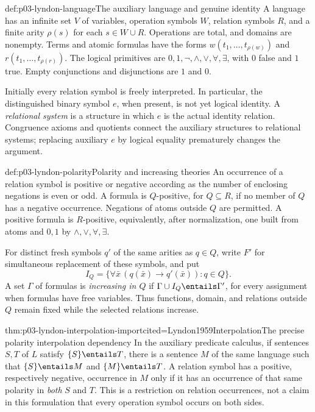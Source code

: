 \begin{hbconvention}{def:p03-lyndon-language}{The auxiliary language and genuine identity}
A language has an infinite set \(V\) of variables, operation symbols
\(W\), relation symbols \(R\), and a finite arity \(\rho(s)\) for each
\(s\in W\cup R\). Operations are total, and domains are nonempty.
Terms and atomic formulas have the forms \(w(t_1,\ldots,t_{\rho(w)})\)
and \(r(t_1,\ldots,t_{\rho(r)})\). The logical primitives are
\(0,1,\neg,\land,\lor,\forall,\exists\), with \(0\) false and
\(1\) true. Empty conjunctions and disjunctions are \(1\) and \(0\).

Initially every relation symbol is freely interpreted. In particular,
the distinguished binary symbol \(e\), when present, is not yet logical
identity. A \emph{relational system} is a structure in which \(e\)
is the actual identity relation. Congruence axioms and quotients connect
the auxiliary structures to relational systems; replacing auxiliary
\(e\) by logical equality prematurely changes the argument.
\end{hbconvention}

\begin{hbdefinition}{def:p03-lyndon-polarity}{Polarity and increasing theories}
An occurrence of a relation symbol is positive or negative according as
the number of enclosing negations is even or odd. A formula is
\(Q\)-positive, for \(Q\subseteq R\), if no member of \(Q\) has
a negative occurrence. Negations of atoms outside \(Q\) are permitted.
A positive formula is \(R\)-positive, equivalently, after normalization,
one built from atoms and \(0,1\) by \(\land,\lor,\forall,\exists\).

For distinct fresh symbols \(q'\) of the same arities as \(q\in Q\),
write \(F'\) for simultaneous replacement of these symbols, and put
\[
 I_Q=\{\forall\bar x\,(q(\bar x)\to q'(\bar x)):q\in Q\}.
\]
A set \(\Gamma\) of formulas is \emph{increasing in \(Q\)} if
\(\Gamma\cup I_Q\entails\Gamma'\), for every assignment when formulas
have free variables. Thus functions, domain, and relations outside \(Q\)
remain fixed while the selected relations increase.
\end{hbdefinition}

\begin{hbtheorem}{thm:p03-lyndon-interpolation-import}{cited=Lyndon1959Interpolation}{The precise polarity interpolation dependency}
In the auxiliary predicate calculus, if sentences \(S,T\) of \(L\) satisfy
\(\{S\}\entails T\), there is a sentence \(M\) of the same language such that
\(\{S\}\entails M\) and \(\{M\}\entails T\). A relation symbol
has a positive, respectively negative, occurrence in \(M\) only if
it has an occurrence of that same polarity in \emph{both} \(S\) and
\(T\). This is a restriction on relation occurrences, not a claim in
this formulation that every operation symbol occurs on both sides.
\end{hbtheorem}

